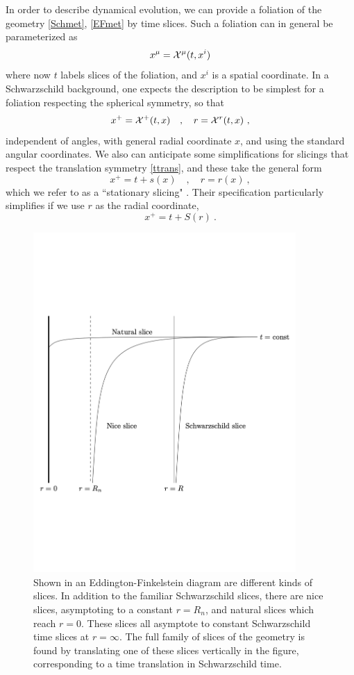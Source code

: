 \documentclass[12pt]{article}
\numberwithin{equation}{section}
\newcommand{\beq}{\begin{equation}}
\newcommand{\eeq}{\end{equation}}
\begin{document}
In order to describe dynamical evolution, we can provide a foliation of the geometry \eqref{Schmet}, \eqref{EFmet} by time slices.  Such a foliation can in general be parameterized as 
\beq\label{sliceparam}
x^\mu= {\cal X}^\mu(t,x^i)
\eeq
where now $t$ labels slices of the foliation, and $x^i$ is a spatial coordinate. In a Schwarzschild background, one expects the description to be simplest for a foliation respecting the spherical symmetry, so that
\beq\label{xrparam}
x^+={\cal X}^+(t,x)\quad,\quad r={\cal X}^r(t,x)\ ,
\eeq
independent of angles, with general radial coordinate $x$, and using the standard angular coordinates.  We also can anticipate some simplifications for slicings that  respect the translation symmetry \eqref{ttrans}, and these take the general form
\beq\label{statgen}
x^+= t+ s(x)\quad,\quad r=r(x)\ ,
\eeq
which we refer to as a ``stationary slicing" \cite{NVU,SEHS}.
Their specification particularly simplifies if we use $r$ as the radial coordinate,
\beq\label{statS}
x^+= t+S(r)\ .
\eeq

\begin{figure}[!hbtp] \begin{center}
\includegraphics[width=10cm]{fig1.pdf}
\end{center}
\caption{Shown in an Eddington-Finkelstein diagram are different kinds of slices. In addition to the familiar Schwarzschild slices, there are nice slices, asymptoting to a constant $r=R_n$, and natural slices which reach $r=0$.  These slices all asymptote to constant Schwarzschild time slices at $r=\infty$.  The full family of slices of the geometry is found by translating one of these slices vertically in the figure, corresponding to a time translation in Schwarzschild time.}
\label{Figslices}
\end{figure} 
\end{document}
